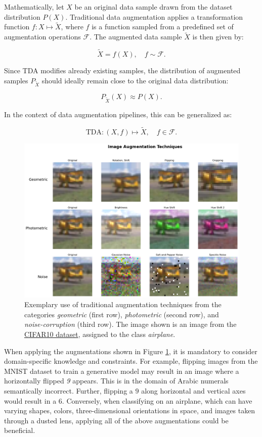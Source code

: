 \noindent
Mathematically, let \( X \) be an original data sample drawn from the dataset distribution \( P(X) \). Traditional data augmentation applies a transformation function \( f: X \mapsto \tilde{X} \), where \( f \) is a function sampled from a predefined set of augmentation operations \( \mathcal{F} \). The augmented data sample \( \tilde{X} \) is then given by:

\[
\tilde{X} = f(X), \quad f \sim \mathcal{F}.
\]

\noindent
Since TDA modifies already existing samples, the distribution of augmented samples \( P_{\tilde{X}} \) should ideally remain close to the original data distribution:

\[
P_{\tilde{X}}(X) \approx P(X).
\]

\noindent
In the context of data augmentation pipelines, this can be generalized as:

\[
\text{TDA}: (X, f) \mapsto \tilde{X}, \quad f \in \mathcal{F}.
\]

\begin{figure}[htbp]
    \centering
    \includegraphics[width=.9\textwidth]{abb/traditional_image_augmentation_examples.png}
    \caption{Exemplary use of traditional augmentation techniques from the categories \textit{geometric} (first row), \textit{photometric} (second row), and \textit{noise-corruption} (third row). The image shown is an image from the \hyperref[used_datasets]{CIFAR10 dataset}, assigned to the class \textit{airplane}.}
    \label{fig:figure_tda_examples}
\end{figure}

\noindent
When applying the augmentations shown in Figure \ref{fig:figure_tda_examples}, it is mandatory to consider domain-specific knowledge and constraints. For example, flipping images from the MNIST dataset to train a generative model may result in an image where a horizontally flipped \textit{9} appears. This is in the domain of Arabic numerals semantically incorrect. Further, flipping a $9$ along horizontal and vertical axes would result in a $6$. Conversely, when classifying on an airplane, which can have varying shapes, colors, three-dimensional orientations in space, and images taken through a dusted lens, applying all of the above augmentations could be beneficial.



